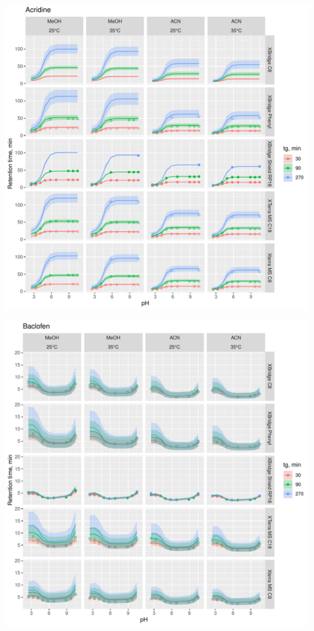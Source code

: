 \documentclass[
]{article}
\begin{document}
\includegraphics{../figures/casestudy2/concordanceplots/Acridine.pdf}

\newpage{}

\includegraphics{../figures/casestudy2/concordanceplots/Baclofen.pdf}
\end{document}
